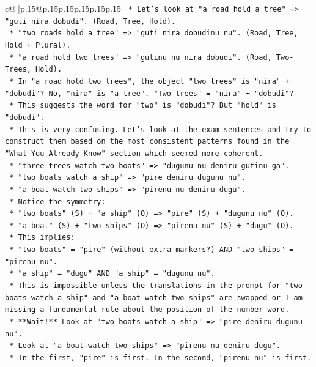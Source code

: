 \documentclass{article}
\begin{document}
{\begin{supertabular}{c@{$\;$}|p{.15\linewidth}@{}p{.15\linewidth}p{.15\linewidth}p{.15\linewidth}p{.15\linewidth}p{.15\linewidth}}
{{{\texttt{        *   Let's look at "a road hold a tree" => "guti nira dobudi". (Road, Tree, Hold).} \\
\texttt{        *   "two roads hold a tree" => "guti nira dobudinu nu". (Road, Tree, Hold + Plural).} \\
\texttt{        *   "a road hold two trees" => "gutinu nu nira dobudi". (Road, Two{-}Trees, Hold).} \\
\texttt{        *   In "a road hold two trees", the object "two trees" is "nira" + "dobudi"? No, "nira" is "a tree". "Two trees" = "nira" + "dobudi"?} \\
\texttt{        *   This suggests the word for "two" is "dobudi"? But "hold" is "dobudi".} \\
\texttt{        *   This is very confusing. Let's look at the exam sentences and try to construct them based on the most consistent patterns found in the "What You Already Know" section which seemed more coherent.} \\
\texttt{        *   "three trees watch two boats" => "dugunu nu deniru gutinu ga".} \\
\texttt{        *   "two boats watch a ship" => "pire deniru dugunu nu".} \\
\texttt{        *   "a boat watch two ships" => "pirenu nu deniru dugu".} \\
\texttt{        *   Notice the symmetry:} \\
\texttt{            *   "two boats" (S) + "a ship" (O) => "pire" (S) + "dugunu nu" (O).} \\
\texttt{            *   "a boat" (S) + "two ships" (O) => "pirenu nu" (S) + "dugu" (O).} \\
\texttt{        *   This implies:} \\
\texttt{            *   "two boats" = "pire" (without extra markers?) AND "two ships" = "pirenu nu".} \\
\texttt{            *   "a ship" = "dugu" AND "a ship" = "dugunu nu".} \\
\texttt{        *   This is impossible unless the translations in the prompt for "two boats watch a ship" and "a boat watch two ships" are swapped or I am missing a fundamental rule about the position of the number word.} \\
\texttt{        *   **Wait!** Look at "two boats watch a ship" => "pire deniru dugunu nu".} \\
\texttt{        *   Look at "a boat watch two ships" => "pirenu nu deniru dugu".} \\
\texttt{        *   In the first, "pire" is first. In the second, "pirenu nu" is first.} \\
}}}
\end{supertabular}}
\end{document}
